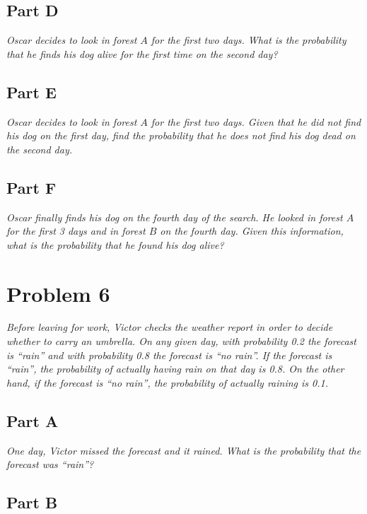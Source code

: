 \documentclass{article}
\begin{document}
\subsection*{Part D}

\textit{Oscar decides to look in forest $ A $ for the first two days. What is
the probability that he finds his dog alive for the first time on the second
day?}

\subsection*{Part E}

\textit{Oscar decides to look in forest $ A $ for the first two days. Given that
he did not find his dog on the first day, find the probability that he does not
find his dog dead on the second day.}

\subsection*{Part F}

\textit{Oscar finally finds his dog on the fourth day of the search. He looked
in forest $ A $ for the first 3 days and in forest $ B $ on the fourth day.
Given this information, what is the probability that he found his dog alive?}

\section*{Problem 6}

\textit{Before leaving for work, Victor checks the weather report in order to
decide whether to carry an umbrella. On any given day, with probability 0.2 the
forecast is “rain” and with probability 0.8 the forecast is “no rain”. If the
forecast is “rain”, the probability of actually having rain on that day is 0.8.
On the other hand, if the forecast is “no rain”, the probability of actually
raining is 0.1.}

\subsection*{Part A}

\textit{One day, Victor missed the forecast and it rained. What is the
probability that the forecast was “rain”?}

\subsection*{Part B}
\end{document}
